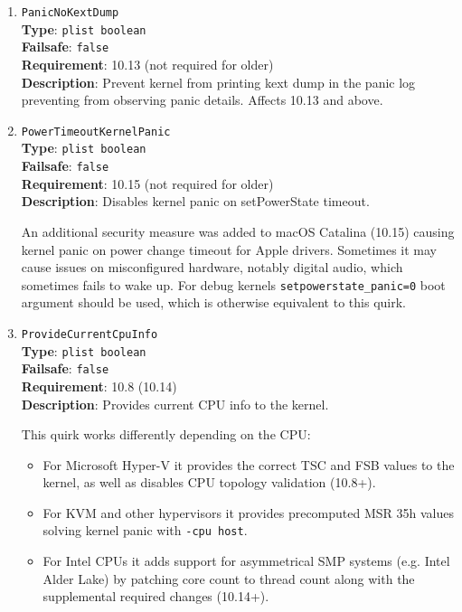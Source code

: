\documentclass[]{article}
\providecommand{\tightlist}{%
  \setlength{\itemsep}{0pt}\setlength{\parskip}{0pt}}
\begin{document}
\begin{enumerate}
\item
  \texttt{PanicNoKextDump}\\
  \textbf{Type}: \texttt{plist\ boolean}\\
  \textbf{Failsafe}: \texttt{false}\\
  \textbf{Requirement}: 10.13 (not required for older)\\
  \textbf{Description}: Prevent kernel from printing kext dump in the panic
  log preventing from observing panic details. Affects 10.13 and above.

\item
  \texttt{PowerTimeoutKernelPanic}\\
  \textbf{Type}: \texttt{plist\ boolean}\\
  \textbf{Failsafe}: \texttt{false}\\
  \textbf{Requirement}: 10.15 (not required for older)\\
  \textbf{Description}: Disables kernel panic on setPowerState timeout.

  An additional security measure was added to macOS Catalina (10.15) causing
  kernel panic on power change timeout for Apple drivers. Sometimes it may cause
  issues on misconfigured hardware, notably digital audio, which sometimes fails
  to wake up. For debug kernels \texttt{setpowerstate\_panic=0} boot argument
  should be used, which is otherwise equivalent to this quirk.

\item
  \texttt{ProvideCurrentCpuInfo}\\
  \textbf{Type}: \texttt{plist\ boolean}\\
  \textbf{Failsafe}: \texttt{false}\\
  \textbf{Requirement}: 10.8 (10.14)\\
  \textbf{Description}: Provides current CPU info to the kernel.

  This quirk works differently depending on the CPU:

  \begin{itemize}
  \tightlist
  \item For Microsoft Hyper-V it provides the correct TSC and FSB values
    to the kernel, as well as disables CPU topology validation (10.8+).
  \item For KVM and other hypervisors it provides precomputed MSR 35h
    values solving kernel panic with \texttt{-cpu host}.
  \item For Intel CPUs it adds support for asymmetrical SMP systems
    (e.g. Intel Alder Lake) by patching core count to thread count along
    with the supplemental required changes (10.14+).
  \end{itemize}


\end{enumerate}
\end{document}

